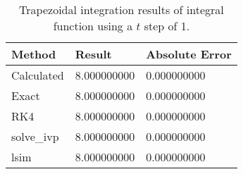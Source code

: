 \begin{singlespace}
\begin{table}[H]
	\centering
	\begin{tabular}{@{} l l l  @{}} 	
		\toprule %
		\footnotesize %
		\raggedright %
		Method	&		Result & Absolute Error		\\
		\midrule		
%
Calculated& 	8.000000000	&0.000000000 \\
Exact & 	8.000000000	&0.000000000 \\
RK4&	8.000000000&	0.000000000 \\
solve\_ivp& 	8.000000000&	0.000000000\\
lsim& 	8.000000000&	0.000000000\\
%
		\bottomrule
	\end{tabular}
	\caption{Trapezoidal integration results of integral function using a $t$ step of 1.}
	\label{tab: trap int res}
\end{table}
\end{singlespace}
	
	